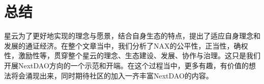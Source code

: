 \section{总结}
星云为了更好地实现的理念与愿景，结合自身生态的特点，提出了适应自身理念和发展的通证经济。在整个文章当中，我们分析了NAX的公平性，正当性，确权性，激励性等，贯穿整个星云的理念、生态建设、发展、协作与治理。这只是我们开展NextDAO方向的一个示范和开端。在这个过程当中，更多有趣，有价值的想法将会涌现出来，同时期待社区的加入一齐丰富NextDAO的内容。
